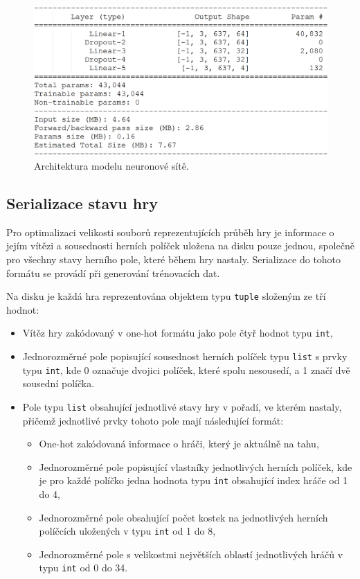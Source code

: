 \documentclass[a4paper,11pt]{article}
\begin{document}
		\begin{figure}[h]
			\centering
			\includegraphics[scale=0.5]{model.png}
			\caption{Architektura modelu neuronové sítě.}
			\label{fig:model}
		\end{figure}
	
	\subsection{Serializace stavu hry}
	\label{serialization}
		Pro optimalizaci velikosti souborů reprezentujících průběh hry je informace o jejím vítězi a sousednosti herních políček uložena na disku pouze jednou, společně pro všechny stavy herního pole, které během hry nastaly. Serializace do tohoto formátu se provádí při generování trénovacích dat.
		
		Na disku je každá hra reprezentována objektem typu \texttt{tuple} složeným ze tří hodnot:
	
		\begin{itemize}
			\item Vítěz hry zakódovaný v one-hot formátu jako pole čtyř hodnot typu \texttt{int},
			\item Jednorozměrné pole popisující sousednost herních políček typu \texttt{list} s prvky typu \texttt{int}, kde 0 označuje dvojici políček, které spolu nesousedí, a 1 značí dvě sousední políčka.
			\item Pole typu \texttt{list} obsahující jednotlivé stavy hry v pořadí, ve kterém nastaly, přičemž jednotlivé prvky tohoto pole mají následující formát:
			\begin{itemize}
				\item One-hot zakódovaná informace o hráči, který je aktuálně na tahu,
				\item Jednorozměrné pole popisující vlastníky jednotlivých herních políček, kde je pro každé políčko jedna hodnota typu \texttt{int} obsahující index hráče od 1 do 4,
				\item Jednorozměrné pole obsahující počet kostek na jednotlivých herních políčcích uložených v typu \texttt{int} od 1 do 8,
				\item Jednorozměrné pole s velikostmi největších oblastí jednotlivých hráčů v typu \texttt{int} od 0 do 34.
			\end{itemize}
		\end{itemize}
	
\end{document}
